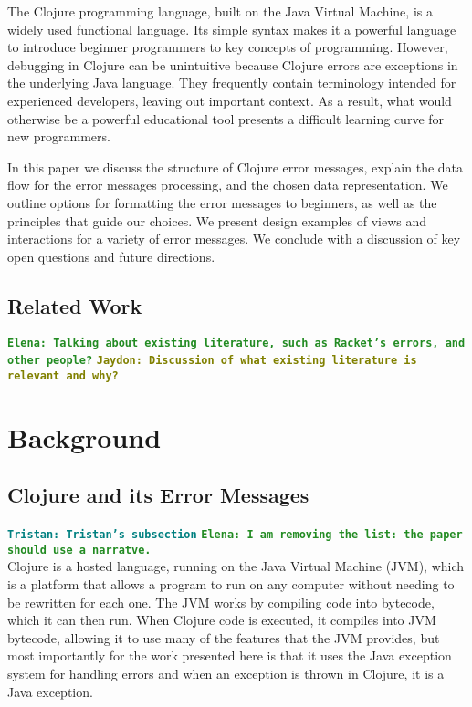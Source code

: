 \documentclass[12pt]{article}
\newcommand{\comment}[1]{{\bf \tt  {#1}}}
\newcommand{\emcomment}[1]{\textcolor{ForestGreen}{\comment{Elena: {#1}}}}
\newcommand{\tkcomment}[1]{\textcolor{Teal}{\comment{Tristan: {#1}}}}
\newcommand{\jscomment}[1]{\textcolor{olive}{\comment{Jaydon: {#1}}}}
\begin{document}
The Clojure programming language, built on the Java Virtual Machine, is a widely used functional language. 
Its simple syntax makes it a powerful language to introduce beginner programmers to key concepts of programming.
However, debugging in Clojure can be unintuitive because Clojure errors are exceptions in the underlying Java language. 
They frequently contain terminology intended for experienced developers, leaving out important context. 
As a result, what would otherwise be a powerful educational tool presents a difficult learning curve for new programmers.

In this paper we discuss the structure of Clojure error messages, 
explain the data flow for the error messages processing, 
and the chosen data representation. 
We outline options for formatting the error messages to beginners, as well as the principles that guide our choices. 
We present design examples of views and interactions for a variety of error messages. 
We conclude with a discussion of key open questions and future directions. 

\subsection{Related Work}\label{subsec:related}

\cite{cosmetic}

\emcomment{Talking about existing literature, such as Racket's errors, and other people?}
\jscomment{Discussion of what existing literature is relevant and why?}

\section{Background}\label{sec:background}

\subsection{Clojure and its Error Messages}\label{subsec:clojure-errs}
\tkcomment{Tristan's subsection}
\emcomment{I am removing the list: the paper should use a narratve. \\}
	Clojure is a hosted language, running on the Java Virtual Machine (JVM), which is a platform that allows a program to run on any computer without needing to be rewritten for each one. 
	The JVM works by compiling code into bytecode, which it can then run. When Clojure code is executed, it compiles into JVM bytecode, allowing it to use many of the features that the JVM provides, 
	but most importantly for the work presented here is that it uses the Java exception system for handling errors and when an exception is thrown in Clojure, it is a Java exception.
    
\end{document}
